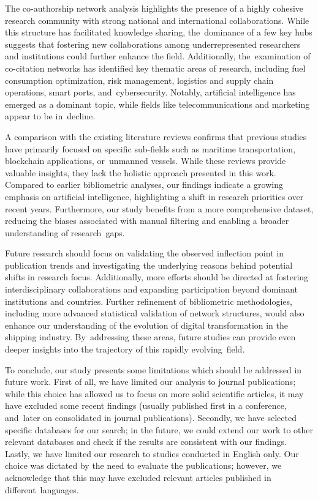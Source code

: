 \documentclass[jmse,review,accept,pdftex,moreauthors]{Definitions/mdpi}
\begin{document}
The co-authorship network analysis highlights the presence of a highly cohesive research community with strong national and international collaborations. While this structure has facilitated knowledge sharing, the~dominance of a few key hubs suggests that fostering new collaborations among underrepresented researchers and institutions could further enhance the field. Additionally, the~examination of co-citation networks has identified key thematic areas of research, including fuel consumption optimization, risk management, logistics and supply chain operations, smart ports, and~cybersecurity. Notably, artificial intelligence has emerged as a dominant topic, while fields like telecommunications and marketing appear to be in~decline.

A comparison with the existing literature reviews confirms that previous studies have primarily focused on specific sub-fields such as maritime transportation, blockchain applications, or~unmanned vessels. While these reviews provide valuable insights, they lack the holistic approach presented in this work. Compared to earlier bibliometric analyses, our findings indicate a growing emphasis on artificial intelligence, highlighting a shift in research priorities over recent years. Furthermore, our study benefits from a more comprehensive dataset, reducing the biases associated with manual filtering and enabling a broader understanding of research~gaps.

Future research should focus on validating the observed inflection point in publication trends and investigating the underlying reasons behind potential shifts in research focus. Additionally, more efforts should be directed at fostering interdisciplinary collaborations and expanding participation beyond dominant institutions and countries. Further refinement of bibliometric methodologies, including more advanced statistical validation of network structures, would also enhance our understanding of the evolution of digital transformation in the shipping industry. By~addressing these areas, future studies can provide even deeper insights into the trajectory of this rapidly evolving~field.

To conclude, our study presents some limitations which should be addressed in future work. First of all, we have limited our analysis to journal publications; while this choice has allowed us to focus on more solid scientific articles, it may have excluded some recent findings (usually published first in a conference, and~later on consolidated in journal publications). Secondly, we have selected specific databases for our search; in the future, we could extend our work to other relevant databases and check if the results are consistent with our findings. Lastly, we have limited our research to studies conducted in English only. Our choice was dictated by the need to evaluate the publications; however, we acknowledge that this may have excluded relevant articles published in different~languages.
\end{document}
